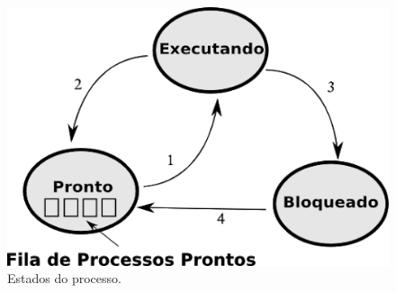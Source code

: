 \begin{figure}[htpb]
    \centering
   \includegraphics[scale=.4]{imagens/processso.png}
   \caption{ Estados do processo. \cite{Tanenbaum2016}}
   \label{fig:processo}
\end{figure}




